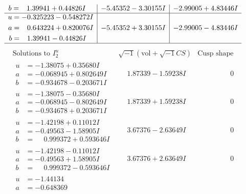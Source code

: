 \documentclass[1p]{elsarticle_modified}
\theoremstyle{definition}
\newcommand{\I}{\sqrt{-1}}
\begin{document}
$$\begin{array}{c|c|c}
\begin{aligned}
b &= \phantom{-}1.39941 + 0.44826 I\end{aligned}
 & -5.45352 - 3.30155 I & -2.99005 + 4.83446 I \\ \hline\begin{aligned}
u &= -0.325223 - 0.548272 I \\
a &= \phantom{-}0.643224 + 0.820076 I \\
b &= \phantom{-}1.39941 - 0.44826 I\end{aligned}
 & -5.45352 + 3.30155 I & -2.99005 - 4.83446 I\\
 \hline 
 \end{array}$$\newpage$$\begin{array}{c|c|c}  
\text{Solutions to }I^u_{2}& \I (\text{vol} + \sqrt{-1}CS) & \text{Cusp shape}\\
 \hline 
\begin{aligned}
u &= -1.38075 + 0.35680 I \\
a &= -0.068945 + 0.802649 I \\
b &= -0.934678 - 0.203671 I\end{aligned}
 & \phantom{-}1.87339 - 1.59238 I & \phantom{-0.000000 } 0 \\ \hline\begin{aligned}
u &= -1.38075 - 0.35680 I \\
a &= -0.068945 - 0.802649 I \\
b &= -0.934678 + 0.203671 I\end{aligned}
 & \phantom{-}1.87339 + 1.59238 I & \phantom{-0.000000 } 0 \\ \hline\begin{aligned}
u &= -1.42198 + 0.11012 I \\
a &= -0.49563 - 1.58905 I \\
b &= \phantom{-}0.999372 + 0.593646 I\end{aligned}
 & \phantom{-}3.67376 - 2.63649 I & \phantom{-0.000000 } 0 \\ \hline\begin{aligned}
u &= -1.42198 - 0.11012 I \\
a &= -0.49563 + 1.58905 I \\
b &= \phantom{-}0.999372 - 0.593646 I\end{aligned}
 & \phantom{-}3.67376 + 2.63649 I & \phantom{-0.000000 } 0 \\ \hline\begin{aligned}
u &= -1.44134\phantom{ +0.000000I} \\
a &= -0.648369\phantom{ +0.000000I} \\

\end{aligned}
\end{array}$$
\end{document}
